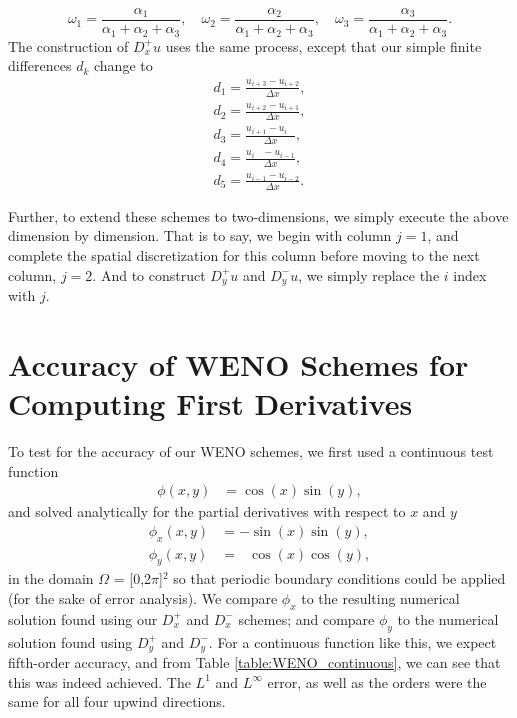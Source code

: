 \documentclass[oneside,12pt,final]{/Applications/TeX/packages/ucthesis-CA2012}
\begin{document}
\begin{mainmatter}
\begin{equation*}
\omega_{1}=\frac{\alpha_{1}}{\alpha_{1}+\alpha_{2}+\alpha_{3}}, \quad
\omega_{2}=\frac{\alpha_{2}}{\alpha_{1}+\alpha_{2}+\alpha_{3}}, \quad
\omega_{3}=\frac{\alpha_{3}}{\alpha_{1}+\alpha_{2}+\alpha_{3}}.
\end{equation*}
The construction of $D^{+}_{x}u$ uses the same process, except that our simple finite differences $d_{k}$ change to
\begin{eqnarray*}
d_{1}=\frac{u_{i+3}-u_{i+2}}{\Delta x}, \\
d_{2}=\frac{u_{i+2}-u_{i+1}}{\Delta x}, \\
d_{3}=\frac{u_{i+1}-u_{i\>\>\>\>\>}}{\Delta x}, \\
d_{4}=\frac{u_{i\>\>\>\>\>}-u_{i-1}}{\Delta x}, \\
d_{5}=\frac{u_{i-1}-u_{i-2}}{\Delta x}.
\end{eqnarray*}

Further, to extend these schemes to two-dimensions, we simply execute the above dimension by dimension. That is to say, we begin with column $j = 1$, and complete the spatial discretization for this column before moving to the next column, $j = 2$. And to construct $D_y^+u$ and $D_y^-u$, we simply replace the $i$ index with $j$.

\section{Accuracy of WENO Schemes for Computing First Derivatives}

To test for the accuracy of our WENO schemes, we first used a continuous test function
\begin{equation}
\begin{aligned}
\phi(x,y)   &=  \cos(x)\sin(y),
\end{aligned}
\end{equation}
and solved analytically for the partial derivatives with respect to $x$ and $y$
\begin{equation} \label{eqn:analytical solution to phi_x}
\begin{aligned}
\phi_x(x,y) &=       -\sin(x)\sin(y), \\
\phi_y(x,y) &=  \>\>\>\cos(x)\cos(y),
\end{aligned}
\end{equation}
in the domain $\Omega$ = [0,2$\pi$]$^2$ so that periodic boundary conditions could be applied (for the sake of error analysis). We compare $\phi_x$ to the resulting numerical solution found using our $D_x^+$ and $D_x^-$ schemes; and compare $\phi_y$ to the numerical solution found using $D_y^+$ and $D_y^-$. For a continuous function like this, we expect fifth-order accuracy, and from Table \ref{table:WENO_continuous}, we can see that this was indeed achieved. The $L^1$ and $L^\infty$ error, as well as the orders were the same for all four upwind directions. 


\end{mainmatter}
\end{document}
